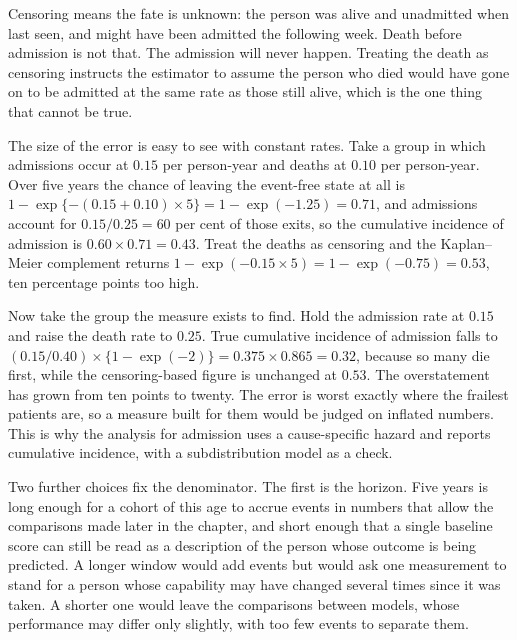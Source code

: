\begin{reading}
Censoring means the fate is unknown: the person was alive and unadmitted when last seen, and might have been admitted the following week. Death before admission is not that. The admission will never happen. Treating the death as censoring instructs the estimator to assume the person who died would have gone on to be admitted at the same rate as those still alive, which is the one thing that cannot be true.

The size of the error is easy to see with constant rates. Take a group in which admissions occur at $0.15$ per person-year and deaths at $0.10$ per person-year. Over five years the chance of leaving the event-free state at all is $1-\exp\{-(0.15+0.10)\times5\}=1-\exp(-1.25)=0.71$, and admissions account for $0.15/0.25=60$ per cent of those exits, so the cumulative incidence of admission is $0.60\times0.71=0.43$. Treat the deaths as censoring and the Kaplan--Meier complement returns $1-\exp(-0.15\times5)=1-\exp(-0.75)=0.53$, ten percentage points too high.

Now take the group the measure exists to find. Hold the admission rate at $0.15$ and raise the death rate to $0.25$. True cumulative incidence of admission falls to $(0.15/0.40)\times\{1-\exp(-2)\}=0.375\times0.865=0.32$, because so many die first, while the censoring-based figure is unchanged at $0.53$. The overstatement has grown from ten points to twenty. The error is worst exactly where the frailest patients are, so a measure built for them would be judged on inflated numbers. This is why the analysis for admission uses a cause-specific hazard \citep{prentice_1978} and reports cumulative incidence, with a subdistribution model \citep{fine_gray_1999} as a check.
\end{reading}

Two further choices fix the denominator. The first is the horizon. Five years is long enough for a cohort of this age to accrue events in numbers that allow the comparisons made later in the chapter, and short enough that a single baseline score can still be read as a description of the person whose outcome is being predicted. A longer window would add events but would ask one measurement to stand for a person whose capability may have changed several times since it was taken. A shorter one would leave the comparisons between models, whose performance may differ only slightly, with too few events to separate them.

